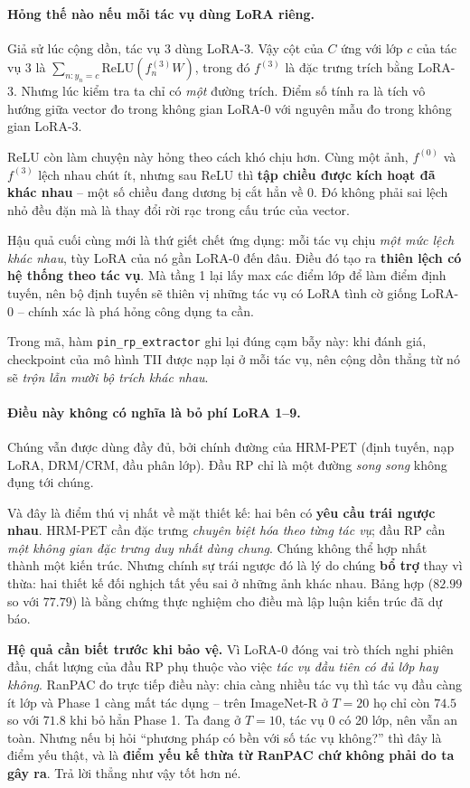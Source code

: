 \documentclass[11pt,a4paper]{article}
\newenvironment{luuy}{\begin{leftbar}\noindent\ignorespaces}{\end{leftbar}}
\begin{document}
\paragraph{Hỏng thế nào nếu mỗi tác vụ dùng LoRA riêng.}
Giả sử lúc cộng dồn, tác vụ 3 dùng LoRA-3. Vậy cột của $C$ ứng với lớp $c$ của
tác vụ 3 là $\sum_{n: y_n = c} \mathrm{ReLU}(f^{(3)}_n W)$, trong đó $f^{(3)}$ là
đặc trưng trích bằng LoRA-3. Nhưng lúc kiểm tra ta chỉ có \emph{một} đường trích.
Điểm số tính ra là tích vô hướng giữa vector đo trong không gian LoRA-0 với
nguyên mẫu đo trong không gian LoRA-3.

ReLU còn làm chuyện này hỏng theo cách khó chịu hơn. Cùng một ảnh, $f^{(0)}$ và
$f^{(3)}$ lệch nhau chút ít, nhưng sau ReLU thì \textbf{tập chiều được kích hoạt
đã khác nhau} -- một số chiều đang dương bị cắt hẳn về 0. Đó không phải sai lệch
nhỏ đều đặn mà là thay đổi rời rạc trong cấu trúc của vector.

Hậu quả cuối cùng mới là thứ giết chết ứng dụng: mỗi tác vụ chịu \emph{một mức
lệch khác nhau}, tùy LoRA của nó gần LoRA-0 đến đâu. Điều đó tạo ra \textbf{thiên
lệch có hệ thống theo tác vụ}. Mà tầng 1 lại lấy max các điểm lớp để làm điểm
định tuyến, nên bộ định tuyến sẽ thiên vị những tác vụ có LoRA tình cờ giống
LoRA-0 -- chính xác là phá hỏng công dụng ta cần.

Trong mã, hàm \texttt{pin\_rp\_extractor} ghi lại đúng cạm bẫy này: khi đánh giá,
checkpoint của mô hình TII được nạp lại ở mỗi tác vụ, nên cộng dồn thẳng từ nó sẽ
\emph{trộn lẫn mười bộ trích khác nhau}.

\paragraph{Điều này không có nghĩa là bỏ phí LoRA 1--9.}
Chúng vẫn được dùng đầy đủ, bởi chính đường của HRM-PET (định tuyến, nạp LoRA,
DRM/CRM, đầu phân lớp). Đầu RP chỉ là một đường \emph{song song} không đụng tới
chúng.

Và đây là điểm thú vị nhất về mặt thiết kế: hai bên có \textbf{yêu cầu trái ngược
nhau}. HRM-PET cần đặc trưng \emph{chuyên biệt hóa theo từng tác vụ}; đầu RP cần
\emph{một không gian đặc trưng duy nhất dùng chung}. Chúng không thể hợp nhất
thành một kiến trúc. Nhưng chính sự trái ngược đó là lý do chúng \textbf{bổ trợ}
thay vì thừa: hai thiết kế đối nghịch tất yếu sai ở những ảnh khác nhau. Bảng hợp
($82.99$ so với $77.79$) là bằng chứng thực nghiệm cho điều mà lập luận kiến trúc
đã dự báo.

\begin{luuy}
\textbf{Hệ quả cần biết trước khi bảo vệ.} Vì LoRA-0 đóng vai trò thích nghi
phiên đầu, chất lượng của đầu RP phụ thuộc vào việc \emph{tác vụ đầu tiên có đủ
lớp hay không}. RanPAC đo trực tiếp điều này: chia càng nhiều tác vụ thì tác vụ
đầu càng ít lớp và Phase 1 càng mất tác dụng -- trên ImageNet-R ở $T = 20$ họ chỉ
còn $74.5$ so với $71.8$ khi bỏ hẳn Phase 1. Ta đang ở $T = 10$, tác vụ 0 có 20
lớp, nên vẫn an toàn. Nhưng nếu bị hỏi ``phương pháp có bền với số tác vụ
không?'' thì đây là điểm yếu thật, và là \textbf{điểm yếu kế thừa từ RanPAC chứ
không phải do ta gây ra}. Trả lời thẳng như vậy tốt hơn né.
\end{luuy}
\end{document}
